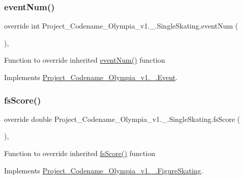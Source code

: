 \subsubsection{\texorpdfstring{event\+Num()}{eventNum()}}
{\footnotesize\ttfamily override int Project\+\_\+\+Codename\+\_\+\+Olympia\+\_\+v1.\+\_.\+Single\+Skating.\+event\+Num (\begin{DoxyParamCaption}{ }\end{DoxyParamCaption})\hspace{0.3cm}{\ttfamily [inline]}, {\ttfamily [virtual]}}

Function to override inherited \hyperlink{classProject__Codename__Olympia__v1_1_1__0_1_1SingleSkating_a651ceefab408b4cbe3106ed7d673ba79}{event\+Num()} function 

Implements \hyperlink{classProject__Codename__Olympia__v1_1_1__0_1_1Event_ad1154ef4dd1dec29d8ebf5614d84b1f3}{Project\+\_\+\+Codename\+\_\+\+Olympia\+\_\+v1.\+\_.\+Event}.

\mbox{\label{classProject__Codename__Olympia__v1_1_1__0_1_1SingleSkating_a0f1837cfe29187ca1c2402f6312f2465}} 
\subsubsection{\texorpdfstring{fs\+Score()}{fsScore()}}
{\footnotesize\ttfamily override double Project\+\_\+\+Codename\+\_\+\+Olympia\+\_\+v1.\+\_.\+Single\+Skating.\+fs\+Score (\begin{DoxyParamCaption}{ }\end{DoxyParamCaption})\hspace{0.3cm}{\ttfamily [inline]}, {\ttfamily [virtual]}}

Function to override inherited \hyperlink{classProject__Codename__Olympia__v1_1_1__0_1_1SingleSkating_a0f1837cfe29187ca1c2402f6312f2465}{fs\+Score()} function 

Implements \hyperlink{classProject__Codename__Olympia__v1_1_1__0_1_1FigureSkating_a437e794fec382863421f8c65e31295f8}{Project\+\_\+\+Codename\+\_\+\+Olympia\+\_\+v1.\+\_.\+Figure\+Skating}.


